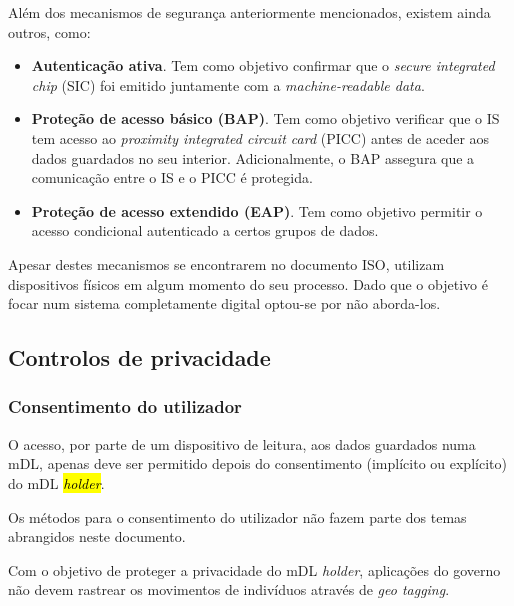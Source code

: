 Além dos mecanismos de segurança anteriormente mencionados, existem ainda outros, como:

\begin{itemize}
    \item \textbf{Autenticação ativa}. Tem como objetivo confirmar que o \emph{secure integrated chip} (SIC) foi emitido juntamente com a \emph{machine-readable data}.
    \item \textbf{Proteção de acesso básico (BAP)}. Tem como objetivo verificar que o IS tem acesso ao \emph{proximity integrated circuit card} (PICC) antes de aceder aos dados guardados no seu interior. Adicionalmente, o BAP assegura que a comunicação entre o IS e o PICC é protegida. 
    \item \textbf{Proteção de acesso extendido (EAP)}. Tem como objetivo permitir o acesso condicional autenticado a certos grupos de dados.
\end{itemize}

Apesar destes mecanismos se encontrarem no documento ISO, utilizam dispositivos físicos 
em algum momento do seu processo. Dado que o objetivo é focar num sistema 
completamente digital optou-se por não aborda-los.


\subsection{Controlos de privacidade}
\label{sec:org1279156}
\subsubsection{Consentimento do utilizador}
\label{sec:orga2915d6}

O acesso, por parte de um dispositivo de leitura, aos dados guardados numa
mDL, apenas deve ser permitido depois do consentimento (implícito ou
explícito) do mDL \emph{\hl{holder}}.

Os métodos para o consentimento do utilizador não fazem parte dos temas
abrangidos neste documento.

Com o objetivo de proteger a privacidade do mDL \emph{holder}, aplicações do
governo não devem rastrear os movimentos de indivíduos através de \emph{geo
tagging}.

